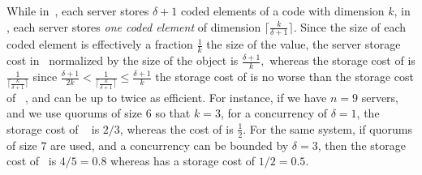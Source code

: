 While in~\treas{}, each server stores $\delta+1$ coded elements of a code with dimension $k$, in \treasmod{}, each server stores \emph{one coded element} of dimension ${\lceil \frac{k}{\delta+1} \rceil}$. Since the size of each coded element is effectively a fraction $\frac{1}{k}$ the size of the value, the server storage cost in~\treas{} normalized by the size of the object is $\frac{\delta+1}{k},$ whereas the storage cost of \treasmod{} is $\frac{1}{\lceil \frac{k}{\delta+1}\rceil}$  since 
$  \frac{\delta+1}{2 k} < \frac{1}{\lceil \frac{k}{\delta+1}\rceil} \leq \frac{\delta+1}{k}$
the storage cost of \treasmod{} is no worse than the storage cost of ~\treas{}, and can be up to twice as efficient. For instance, if we have $n=9$ servers, and we use quorums of size $6$ so that $k=3$, for a concurrency of $\delta=1$, the storage cost of ~\treas{} is $2/3$, whereas the cost of \treasmod{} is $\frac{1}{2}.$ For the same system, if quorums of size $7$ are used, and a concurrency can be bounded by $\delta=3$, then the storage cost of~\treas{} is $4/5=0.8$ whereas \treasmod{} has a storage cost of $1/2=0.5$. 
